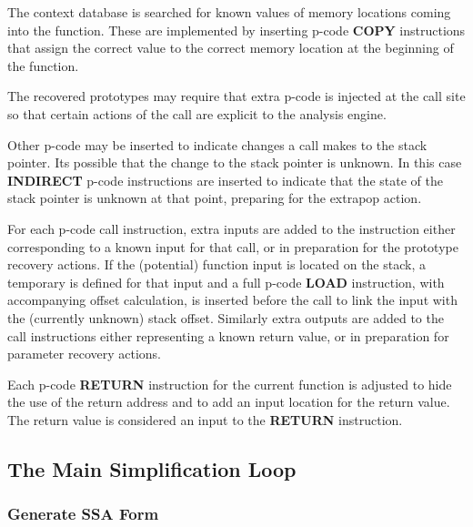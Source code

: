 \begin{DoxyEnumerate}
\item The context database is searched for known values of memory locations coming into the function. These are implemented by inserting p-\/code {\bfseries{C\+O\+PY}} instructions that assign the correct value to the correct memory location at the beginning of the function.
\item The recovered prototypes may require that extra p-\/code is injected at the call site so that certain actions of the call are explicit to the analysis engine.
\item Other p-\/code may be inserted to indicate changes a call makes to the stack pointer. Its possible that the change to the stack pointer is unknown. In this case {\bfseries{I\+N\+D\+I\+R\+E\+CT}} p-\/code instructions are inserted to indicate that the state of the stack pointer is unknown at that point, preparing for the extrapop action.
\item For each p-\/code call instruction, extra inputs are added to the instruction either corresponding to a known input for that call, or in preparation for the prototype recovery actions. If the (potential) function input is located on the stack, a temporary is defined for that input and a full p-\/code {\bfseries{L\+O\+AD}} instruction, with accompanying offset calculation, is inserted before the call to link the input with the (currently unknown) stack offset. Similarly extra outputs are added to the call instructions either representing a known return value, or in preparation for parameter recovery actions.
\item Each p-\/code {\bfseries{R\+E\+T\+U\+RN}} instruction for the current function is adjusted to hide the use of the return address and to add an input location for the return value. The return value is considered an input to the {\bfseries{R\+E\+T\+U\+RN}} instruction.
\end{DoxyEnumerate}\hypertarget{index_step5}{}\subsection{The Main Simplification Loop}\label{index_step5}
\hypertarget{index_step5a}{}\subsubsection{Generate S\+S\+A Form}\label{index_step5a}
